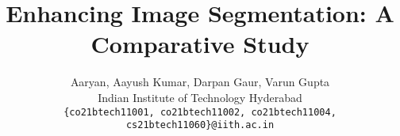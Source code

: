 \documentclass[10pt,twocolumn,letterpaper]{article}
\title{Enhancing Image Segmentation: A Comparative Study}
\author{Aaryan,  \quad  Aayush Kumar, \quad  Darpan Gaur, \quad  Varun Gupta\\
Indian Institute of Technology Hyderabad\\
{\tt\small \{co21btech11001, co21btech11002, co21btech11004, cs21btech11060\}@iith.ac.in}
}
\begin{document}
\maketitle
    

% 
% 




{
    \small
    
    
}

% 
\end{document}
